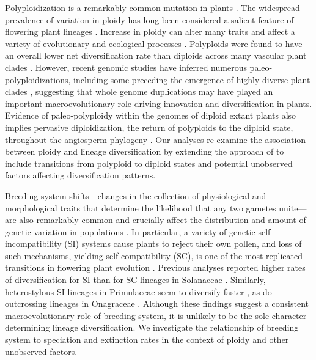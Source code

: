 Polyploidization is a remarkably common mutation in plants \citep{husband_2013, zenilferguson_2017}.
The widespread prevalence of variation in ploidy has long been considered a salient feature of flowering plant lineages \citep{stebbins1938}. 
Increase in ploidy can alter many traits and affect a variety of evolutionary and ecological processes \citep{ramsey_2002, sessa_2019}.
Polyploids were found to have an overall lower net diversification rate than diploids across many vascular plant clades \citep{mayrose_2011, mayrose_2015}. 
However, recent genomic studies have inferred numerous paleo-polyploidizations, including some preceding the emergence of highly diverse plant clades \citep{soltis_2014, landis_2018}, suggesting that whole genome duplications may have played an important macroevolutionary role driving innovation and diversification in plants. 
Evidence of paleo-polyploidy within the genomes of diploid extant plants also implies pervasive diploidization, the return of polyploids to the diploid state, throughout the angiosperm phylogeny \citep{soltis_2015, dodsworth_2015}.
Our analyses re-examine the association between ploidy and lineage diversification by extending the approach of \citet{mayrose_2011, mayrose_2015} to include transitions from polyploid to diploid states and potential unobserved factors affecting diversification patterns.

Breeding system shifts---changes in the collection of physiological and morphological traits that determine the likelihood that any two gametes unite---are also remarkably common and crucially affect the distribution and amount of genetic variation in populations \citep{barrett2013}. %
In particular, a variety of genetic self-incompatibility (SI) systems cause plants to reject their own pollen, and loss of such mechanisms, yielding self-compatibility (SC), is one of the most replicated transitions in flowering plant evolution \citep{stebbins1974, igic_2008}.
Previous analyses reported higher rates of diversification for SI than for SC lineages in Solanaceae \citep{goldberg_2010}. 
Similarly, heterostylous SI lineages in Primulaceae seem to diversify faster \citep{devos2014}, as do outcrossing lineages in Onagraceae \citep{freyman_2019}.
Although these findings suggest a consistent macroevolutionary role of breeding system, it is unlikely to be the sole character determining lineage diversification.
We investigate the relationship of breeding system to speciation and extinction rates in the context of ploidy and other unobserved factors.

